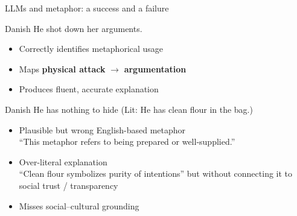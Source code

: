 \documentclass[dvipsnames]{beamer}
\begin{document}
\begin{frame}{LLMs and metaphor: a success and a failure}
  \begin{exe}
    \ex {} \hfill Danish
    \trans He shot down her arguments.
  \end{exe}
  \begin{itemize}
  \item Correctly identifies metaphorical usage
  \item Maps \textbf{physical attack} $\rightarrow$ \textbf{argumentation}
  \item Produces fluent, accurate explanation
  \end{itemize}

  \begin{exe}
    \ex {} \hfill Danish
    \trans He has nothing to hide (Lit: He has clean flour in the bag.)
  \end{exe}
  \begin{itemize}
  \item Plausible but wrong English-based metaphor
    \\ “This metaphor refers to being prepared or well-supplied.”
  \item Over-literal explanation
    \\ “Clean flour symbolizes purity of intentions”
    but without connecting it to social trust / transparency
  \item Misses social–cultural grounding
  \end{itemize}


\end{frame}
\end{document}

